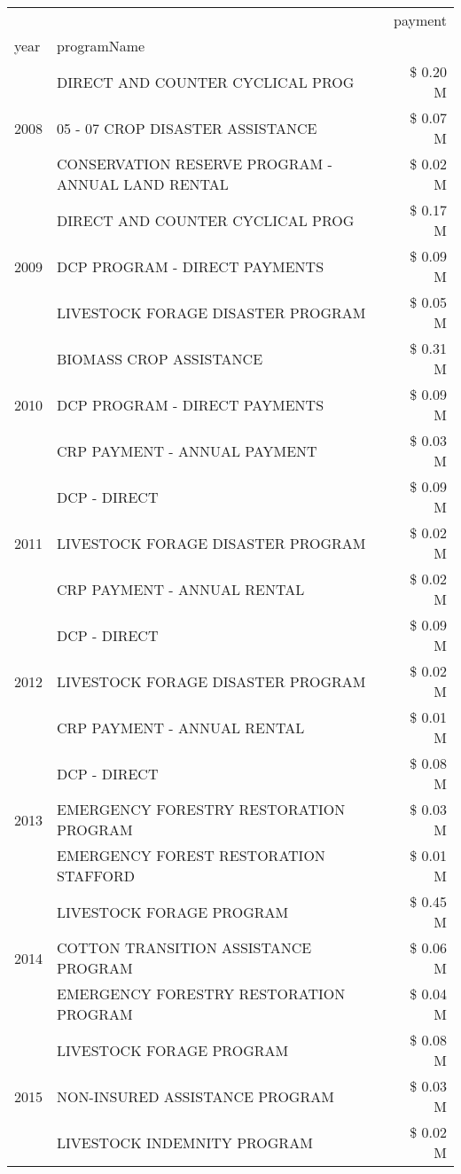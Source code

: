 \begin{tabular}{llr}
\toprule
 &  & payment \\
year & programName &  \\
\midrule
\multirow[t]{3}{*}{2008} & DIRECT AND COUNTER CYCLICAL PROG & \$ 0.20 M \\
 & 05 - 07 CROP DISASTER ASSISTANCE & \$ 0.07 M \\
 & CONSERVATION RESERVE PROGRAM - ANNUAL LAND RENTAL & \$ 0.02 M \\
\cline{1-3}
\multirow[t]{3}{*}{2009} & DIRECT AND COUNTER CYCLICAL PROG & \$ 0.17 M \\
 & DCP PROGRAM - DIRECT PAYMENTS & \$ 0.09 M \\
 & LIVESTOCK FORAGE DISASTER  PROGRAM & \$ 0.05 M \\
\cline{1-3}
\multirow[t]{3}{*}{2010} & BIOMASS CROP ASSISTANCE & \$ 0.31 M \\
 & DCP PROGRAM - DIRECT PAYMENTS & \$ 0.09 M \\
 & CRP PAYMENT - ANNUAL PAYMENT & \$ 0.03 M \\
\cline{1-3}
\multirow[t]{3}{*}{2011} & DCP - DIRECT & \$ 0.09 M \\
 & LIVESTOCK FORAGE DISASTER PROGRAM & \$ 0.02 M \\
 & CRP PAYMENT - ANNUAL RENTAL & \$ 0.02 M \\
\cline{1-3}
\multirow[t]{3}{*}{2012} & DCP - DIRECT & \$ 0.09 M \\
 & LIVESTOCK FORAGE DISASTER PROGRAM & \$ 0.02 M \\
 & CRP PAYMENT - ANNUAL RENTAL & \$ 0.01 M \\
\cline{1-3}
\multirow[t]{3}{*}{2013} & DCP - DIRECT & \$ 0.08 M \\
 & EMERGENCY FORESTRY RESTORATION PROGRAM & \$ 0.03 M \\
 & EMERGENCY FOREST RESTORATION STAFFORD & \$ 0.01 M \\
\cline{1-3}
\multirow[t]{3}{*}{2014} & LIVESTOCK FORAGE PROGRAM & \$ 0.45 M \\
 & COTTON TRANSITION ASSISTANCE PROGRAM & \$ 0.06 M \\
 & EMERGENCY FORESTRY RESTORATION PROGRAM & \$ 0.04 M \\
\cline{1-3}
\multirow[t]{3}{*}{2015} & LIVESTOCK FORAGE PROGRAM & \$ 0.08 M \\
 & NON-INSURED ASSISTANCE PROGRAM & \$ 0.03 M \\
 & LIVESTOCK INDEMNITY PROGRAM & \$ 0.02 M \\
\cline{1-3}

\end{tabular}

